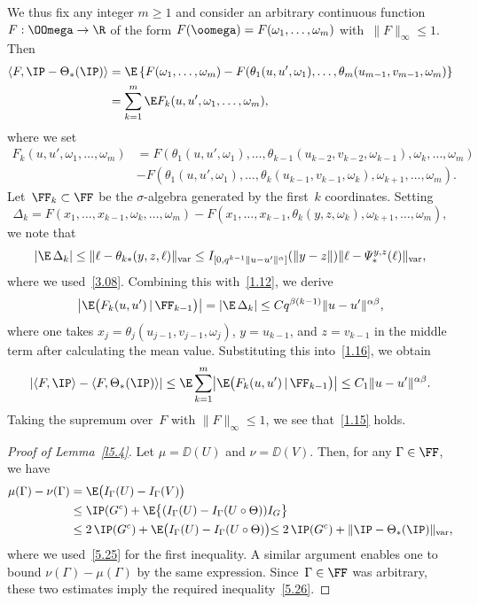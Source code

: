 We thus fix any integer $m\ge1$ and consider an arbitrary continuous function $F:\OOmega\to\R$ of the form $F(\oomega)=F(\omega_1,\dots,\omega_m)$ with~$\|F\|_\infty\le 1$. Then
\begin{align}
\langle F,\IP-\Theta_*(\IP)\rangle
&=\E\left\{F(\omega_1,\dots,\omega_m)
-F(\theta_1(u,u',\omega_1),\dots,\theta_m(u_{m-1},v_{m-1},\omega_m)\right\}
\notag\\
&=\sum_{k=1}^m \E F_k(u,u',\omega_1,\dots,\omega_m),
\label{1.16}
\end{align}
where we set
\begin{align*}
F_k(u,u',\omega_1,\dots,\omega_m)
&=F(\theta_1(u,u',\omega_1),\dots,\theta_{k-1}(u_{k-2},v_{k-2},\omega_{k-1}),\omega_k,\dots,\omega_m)\\
&-F(\theta_{1}(u,u',\omega_1),\dots,\theta_{k}(u_{k-1},v_{k-1},\omega_{k}),\omega_{k+1},\dots,\omega_m).
\end{align*}
Let~$\FF_k\subset\FF$ be the $\sigma$-algebra generated by the first~$k$ coordinates. Setting
\[
\Delta_k=F(x_1,\dots,x_{k-1},\omega_k,\dots,\omega_m)
-F(x_1,\dots,x_{k-1},\theta_{k}(y,z,\omega_{k}),\omega_{k+1},\dots,\omega_m),
\]
we note that
\[
|\E\,\Delta_k|\le \|\ell-\theta_{k*}(y,z,\ell)\|_{\mathrm{var}}
\le I_{[0,q^{k-1}\|u-u'\|^\alpha]}(\|y-z\|)\|\ell-\varPsi_*^{y,z}(\ell)\|_{\mathrm{var}},
\]
where we used~\eqref{3.08}. Combining this with~\eqref{1.12}, we derive
\begin{align*}
\bigl|\E\bigl(F_k(u,u')\,|\,\FF_{k-1}\bigr)\bigr|=|\E\,\Delta_k|
\le Cq^{\beta(k-1)}\|u-u'\|^{\alpha\beta},
\end{align*}
where one takes $x_j =\theta_j(u_{j-1},v_{j-1},\omega_j)$, $y=u_{k-1}$, and $z=v_{k-1}$ in the middle term after calculating the mean value.
Substituting this into~\eqref{1.16}, we obtain
\[
|\langle F,\IP\rangle-\langle F,\Theta_*(\IP)\rangle|
\le \E\sum_{k=1}^m \bigl|\E\bigl(F_k(u,u')\,|\,\FF_{k-1}\bigr)\bigr|
\le C_1\|u-u'\|^{\alpha\beta}.
\]
Taking the supremum over~$F$ with $\|F\|_\infty\le1$, we see that~\eqref{1.15} holds.

\begin{proof}[Proof of Lemma~\ref{l5.4}]
Let $\mu=\DD(U)$ and $\nu=\DD(V)$. Then, for any $\Gamma\in\FF$, we have
\begin{align*}
\mu(\Gamma)-\nu(\Gamma)
&=\E\bigl(I_\Gamma(U)-I_\Gamma(V)\bigl)\\
&\le \IP(G^c)+\E\bigl\{(I_\Gamma(U)-I_\Gamma(U\circ\Theta))I_G\bigl\}\\
&\le 2\,\IP(G^c)+\E\bigl(I_\Gamma(U)-I_\Gamma(U\circ\Theta)\bigl)
\le 2\,\IP(G^c)+\|\IP-\Theta_*(\IP)\|_{\mathrm{var}},
\end{align*}
where we used~\eqref{5.25} for the first inequality.
A similar argument enables one to bound $\nu(\Gamma)-\mu(\Gamma)$ by the same expression. Since~$\Gamma\in\FF$ was arbitrary, these two estimates imply the required inequality~\eqref{5.26}.
\end{proof}

